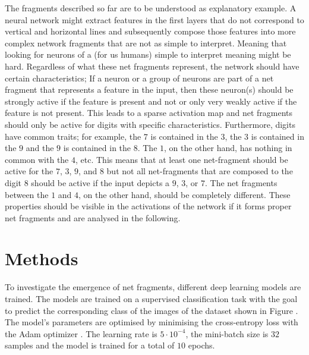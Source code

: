 The fragments described so far are to be understood as explanatory example.
A neural network might extract features in the first layers that do not correspond to vertical and horizontal lines and subsequently compose those features into more complex network fragments that are not as simple to interpret.
Meaning that looking for neurons of a (for us humans) simple to interpret meaning might be hard.
Regardless of what these net fragments represent, the network should have certain characteristics;
If a neuron or a group of neurons are part of a net fragment that represents a feature in the input, then these neuron(s) should be strongly active if the feature is present and not or only very weakly active if the feature is not present.
This leads to a sparse activation map and net fragments should only be active for digits with specific characteristics.
Furthermore, digits have common traits;
for example, the $7$ is contained in the $3$, the $3$ is contained in the $9$ and the $9$ is contained in the $8$.
The $1$, on the other hand, has nothing in common with the $4$, etc.
This means that at least one net-fragment should be active for the $7$, $3$, $9$, and $8$ but not all net-fragments that are composed to the digit $8$ should be active if the input depicts a $9$, $3$, or $7$.
The net fragments between the $1$ and $4$, on the other hand, should be completely different.
These properties should be visible in the activations of the network if it forms proper net fragments and are analysed in the following.

\section{Methods}
To investigate the emergence of net fragments, different deep learning models are trained.
The models are trained on a supervised classification task with the goal to predict the corresponding class of the images of the dataset shown in Figure .
The model's parameters are optimised by minimising the cross-entropy loss with the Adam optimizer .
The learning rate is $5 \cdot 10^{-4}$, the mini-batch size is $32$ samples and the model is trained for a total of $10$ epochs.

